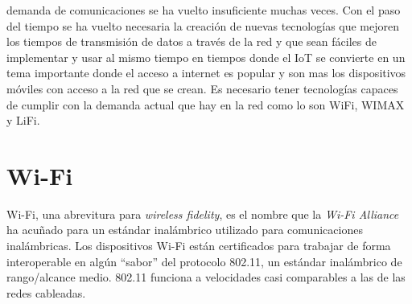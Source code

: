 \documentclass[10pt,journal,compsoc]{IEEEtran}
\begin{document}




% 
% 
% 
% 
 demanda de comunicaciones se ha vuelto insuficiente muchas veces. Con el paso del tiempo se ha vuelto necesaria la creación de nuevas tecnologías que mejoren los tiempos de transmisión de datos a través de la red y que sean fáciles de implementar y usar al mismo tiempo en tiempos donde el IoT se convierte en un tema importante donde el acceso a internet es popular y son mas los dispositivos móviles con acceso a la red que se crean. Es necesario tener tecnologías capaces de cumplir con la demanda actual que hay en la red como lo son WiFi, WIMAX y LiFi.


\section{Wi-Fi}
Wi-Fi, una abrevitura para \emph{wireless fidelity}, es el nombre que la \emph{Wi-Fi Alliance} ha acuñado para un estándar inalámbrico utilizado para comunicaciones inalámbricas. Los dispositivos Wi-Fi están certificados para trabajar de forma interoperable en algún ``sabor'' del protocolo 802.11, un estándar inalámbrico de rango/alcance medio. 802.11 funciona a velocidades casi comparables a las de las redes cableadas.
\end{document}
